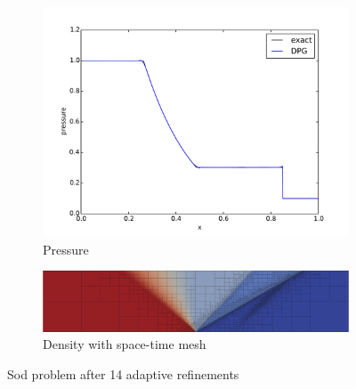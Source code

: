 \documentclass{parcfd2014}
\begin{document}
\begin{figure}[h]
\begin{subfigure}[c]{0.3\textwidth}
\includegraphics[width=\textwidth]{figs/Sod1e-5/pres15.pdf}
\caption{Pressure}
\label{fig:sod_pres14}
\end{subfigure}
\begin{subfigure}[c]{0.9\textwidth}
\centering
\includegraphics[width=\textwidth]{figs/Sod1e-5/mesh15.png}
\caption{Density with space-time mesh}
\label{fig:sod_mesh14}
\end{subfigure}
\caption{Sod problem after 14 adaptive refinements}
\label{fig:sod}
\end{figure}






\end{document}
